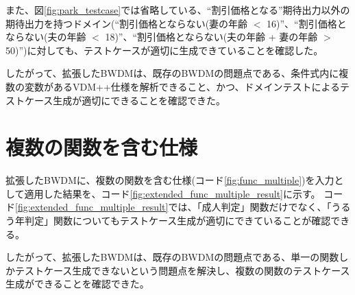 \documentclass[uplatex, report, a4j, 10pt]{jsbook}
\begin{document}
また、図\ref{fig:park_testcase}では省略している、“割引価格となる”期待出力以外の期待出力を持つドメイン(“割引価格とならない(妻の年齢 $<$ 16)”、“割引価格とならない(夫の年齢 $<$ 18)”、“割引価格とならない(夫の年齢 + 妻の年齢 $>$ 50)”)に対しても、テストケースが適切に生成できていることを確認した。

したがって、拡張したBWDMは、既存のBWDMの問題点である、条件式内に複数の変数があるVDM++仕様を解析できること、かつ、ドメインテストによるテストケース生成が適切にできることを確認できた。


\section{複数の関数を含む仕様}
拡張したBWDMに、複数の関数を含む仕様(コード\ref{fig:func_multiple})を入力として適用した結果を、コード\ref{fig:extended_func_multiple_result}に示す。
コード\ref{fig:extended_func_multiple_result}では、「成人判定」関数だけでなく、「うるう年判定」関数についてもテストケース生成が適切にできていることが確認できる。

したがって、拡張したBWDMは、既存のBWDMの問題点である、単一の関数しかテストケース生成できないという問題点を解決し、複数の関数のテストケース生成ができることを確認できた。
\end{document}
